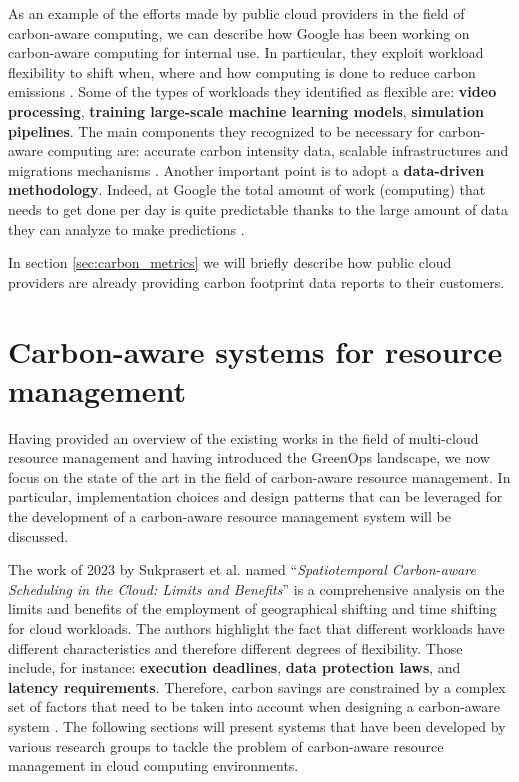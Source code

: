 As an example of the efforts made by public cloud providers in the field of carbon-aware computing, we can describe how Google has been working on carbon-aware computing for internal use. 
In particular, they exploit workload flexibility to shift when, where and how computing is done to reduce carbon emissions \cite{google_carbon_aware_computing}.
Some of the types of workloads they identified as flexible are: \textbf{video processing}, \textbf{training large-scale machine learning models}, \textbf{simulation pipelines}.
The main components they recognized to be necessary for carbon-aware computing are: accurate carbon intensity data, scalable infrastructures and migrations mechanisms \cite{google_carbon_aware_computing}.
Another important point is to adopt a \textbf{data-driven methodology}.
Indeed, at Google the total amount of work (computing) that needs to get done per day is quite predictable thanks to the large amount of data they can analyze to make predictions \cite{google_carbon_aware_computing}.

In section \ref{sec:carbon_metrics} we will briefly describe how public cloud providers are already providing carbon footprint data reports to their customers.

\section{Carbon-aware systems for resource management}

Having provided an overview of the existing works in the field of multi-cloud resource management and having introduced the GreenOps landscape, we now focus on the state of the art in the field of carbon-aware resource management.
In particular, implementation choices and design patterns that can be leveraged for the development of a carbon-aware resource management system will be discussed.
\newline

The work of 2023 by Sukprasert et al. named ``\textit{Spatiotemporal Carbon-aware Scheduling in the Cloud: Limits and Benefits}'' \cite{10.1145/3599733.3606301} is a comprehensive analysis on the limits and benefits of the employment of geographical shifting and time shifting for cloud workloads.
The authors highlight the fact that different workloads have different characteristics and therefore different degrees of flexibility. Those include, for instance: \textbf{execution deadlines}, \textbf{data protection laws}, and \textbf{latency requirements}. Therefore, carbon savings are constrained by a complex set of factors that need to be taken into account when designing a carbon-aware system \cite{10.1145/3599733.3606301}.
The following sections will present systems that have been developed by various research groups to tackle the problem of carbon-aware resource management in cloud computing environments.

